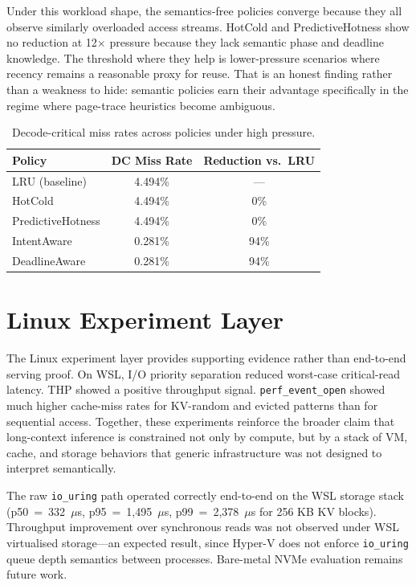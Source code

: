 \documentclass[10pt,twocolumn]{article}
\begin{document}
Under this workload shape, the semantics-free policies converge because they all observe similarly overloaded access streams. HotCold and PredictiveHotness show no reduction at 12$\times$ pressure because they lack semantic phase and deadline knowledge. The threshold where they help is lower-pressure scenarios where recency remains a reasonable proxy for reuse. That is an honest finding rather than a weakness to hide: semantic policies earn their advantage specifically in the regime where page-trace heuristics become ambiguous.

\begin{table}[t]
\centering
\caption{Decode-critical miss rates across policies under high pressure.}
\label{tab:results}
\begin{tabular}{lcc}
\toprule
Policy & DC Miss Rate & Reduction vs.\ LRU \\
\midrule
LRU (baseline)      & 4.494\%  & --- \\
HotCold             & 4.494\%  & 0\% \\
PredictiveHotness   & 4.494\%  & 0\% \\
IntentAware         & 0.281\%  & 94\% \\
DeadlineAware       & 0.281\%  & 94\% \\
\bottomrule
\end{tabular}
\end{table}

\section{Linux Experiment Layer}
\label{sec:linux}

The Linux experiment layer provides supporting evidence rather than end-to-end serving proof. On WSL, I/O priority separation reduced worst-case critical-read latency. THP showed a positive throughput signal. \texttt{perf\_event\_open} showed much higher cache-miss rates for KV-random and evicted patterns than for sequential access. Together, these experiments reinforce the broader claim that long-context inference is constrained not only by compute, but by a stack of VM, cache, and storage behaviors that generic infrastructure was not designed to interpret semantically.

The raw \texttt{io\_uring} path operated correctly end-to-end on the WSL storage stack (p50~=~332~$\mu$s, p95~=~1{,}495~$\mu$s, p99~=~2{,}378~$\mu$s for 256 KB KV blocks). Throughput improvement over synchronous reads was not observed under WSL virtualised storage---an expected result, since Hyper-V does not enforce \texttt{io\_uring} queue depth semantics between processes. Bare-metal NVMe evaluation remains future work.
\end{document}
